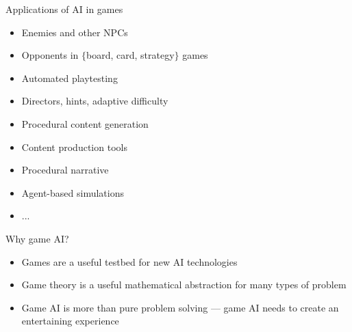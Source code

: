 \begin{frame}{Applications of AI in games}
	\begin{itemize}
		\pause\item Enemies and other NPCs
		\pause\item Opponents in $\{$board, card, strategy$\}$ games
		\pause\item Automated playtesting
		\pause\item Directors, hints, adaptive difficulty
		\pause\item Procedural content generation
		\pause\item Content production tools
		\pause\item Procedural narrative
		\pause\item Agent-based simulations
		\pause\item ...
	\end{itemize}
\end{frame}

\begin{frame}{Why game AI?}
	\begin{itemize}
		\pause\item Games are a useful testbed for new AI technologies
		\pause\item Game theory is a useful mathematical abstraction for many types of problem
		\pause\item Game AI is more than pure problem solving --- game AI needs to create an entertaining experience
	\end{itemize}
\end{frame}
